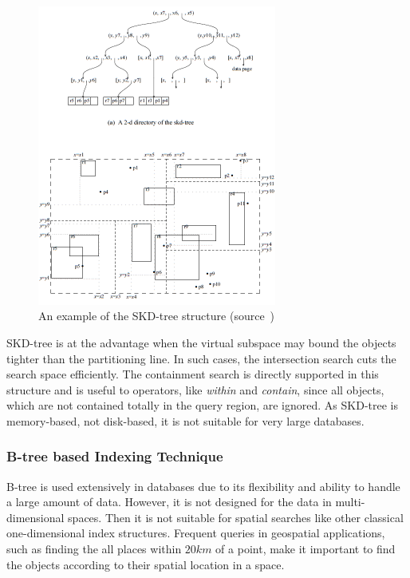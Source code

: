 \documentclass[a4paper,12pt]{article}
\begin{document}
\begin{figure}
\centering
\includegraphics[width=0.7\textwidth,height=0.6\textheight]{skdtree}
\caption{An example of the SKD-tree structure (source~\cite{survey})}
\label{figskdtree}
\end{figure} 
SKD-tree is at the advantage when the virtual subspace may bound the objects tighter than the partitioning line. In such cases, the intersection search cuts the search space efficiently. The containment search is directly supported in this structure and is useful to operators, like \textit{within} and \textit{contain}, since all objects, which are not contained totally in the query region, are ignored.
As SKD-tree is memory-based, not disk-based, it is not suitable for very large databases.


 


\subsubsection{B-tree based Indexing Technique}
\label{b-tree-based}
B-tree is used extensively in databases due to its flexibility and ability to handle a large amount of data. However, it is not designed for the data in multi-dimensional spaces. Then it is not suitable for spatial searches like other classical one-dimensional index structures. Frequent queries in geospatial applications, such as finding the all places within $20 km$ of a point, make it important to find the objects according to their spatial location in a space. 
\end{document}
